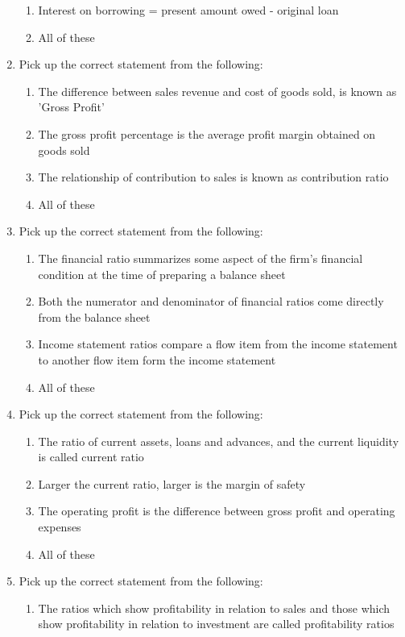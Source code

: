 \documentclass[11pt,a4paper]{article}
\begin{document}
\begin{enumerate}
\begin{enumerate}[label=\Alph*.]
\item{Interest on borrowing = present amount owed - original loan}
\item{All of these}
\end{enumerate}
\item{Pick up the correct statement from the following:}
\begin{enumerate}[label=\Alph*.]
\item{The difference between sales revenue and cost of goods sold, is known as 'Gross Profit'}
\item{The gross profit percentage is the average profit margin obtained on goods sold}
\item{The relationship of contribution to sales is known as contribution ratio}
\item{All of these}
\end{enumerate}
\item{Pick up the correct statement from the following:}
\begin{enumerate}[label=\Alph*.]
\item{The financial ratio summarizes some aspect of the firm's financial condition at the time of preparing a balance sheet}
\item{Both the numerator and denominator of financial ratios come directly from the balance sheet}
\item{Income statement ratios compare a flow item from the income statement to another flow item form the income statement}
\item{All of these}
\end{enumerate}
\item{Pick up the correct statement from the following:}
\begin{enumerate}[label=\Alph*.]
\item{The ratio of current assets, loans and advances, and the current liquidity is called current ratio}
\item{Larger the current ratio, larger is the margin of safety}
\item{The operating profit is the difference between gross profit and operating expenses}
\item{All of these}
\end{enumerate}
\item{Pick up the correct statement from the following:}
\begin{enumerate}[label=\Alph*.]
\item{The ratios which show profitability in relation to sales and those which show profitability in relation to investment are called profitability ratios}

\end{enumerate}
\end{enumerate}
\end{document}
